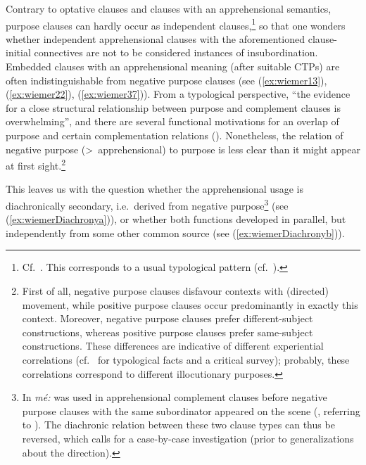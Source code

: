 \documentclass[output=paper,colorlinks,citecolor=brown]{langscibook}
\begin{document}
 Contrary to optative clauses and clauses with an apprehensional semantics, purpose clauses can hardly occur as independent clauses,\footnote{Cf.\ \citet[271--272]{Dobrushina2016}. This corresponds to a usual typological pattern \mbox{(cf.\ \citealt[150--151]{Schmidtke-Bode2009}).}} so that one wonders whether independent apprehensional clauses with the aforementioned clause-initial connectives are not to be considered instances of insubordination. Embedded clauses with an apprehensional meaning (after suitable CTPs) are often indistinguishable from negative purpose clauses (see (\ref{ex:wiemer13}), (\ref{ex:wiemer22}), (\ref{ex:wiemer37})). From a typological perspective, ``the evidence for a close structural relationship between purpose and complement clauses is overwhelming'', and there are several functional motivations for an overlap of purpose and certain complementation relations (\citealt[161, 164]{Schmidtke-Bode2009}). Nonetheless, the relation of negative purpose (>~apprehensional) to purpose is less clear than it might appear at first sight.\footnote{First of all, negative purpose clauses disfavour contexts with (directed) movement, while positive purpose clauses occur predominantly in exactly this context. Moreover, negative purpose clauses prefer different-subject constructions, whereas positive purpose clauses prefer same-subject constructions. These differences are indicative of different experiential correlations (cf.\ \citealt[129--144]{Schmidtke-Bode2009} for typological facts and a critical survey); probably, these correlations correspond to different illocutionary purposes.}


This leaves us with the question whether the apprehensional usage is diachronically secondary, i.e.\ derived from negative purpose\footnote{In  \textit{mé:} was used in apprehensional complement clauses before negative purpose clauses with the same subordinator appeared on the scene (\citealt[142--143]{dobrushina2021}, referring to \citealt{Goodwin1897}). The diachronic relation between these two clause types can thus be reversed, which calls for a case-by-case investigation (prior to generalizations about the direction).} (see (\ref{ex:wiemerDiachronya})), or whether both functions developed in parallel, but independently from some other common source (see (\ref{ex:wiemerDiachronyb})).
\end{document}
